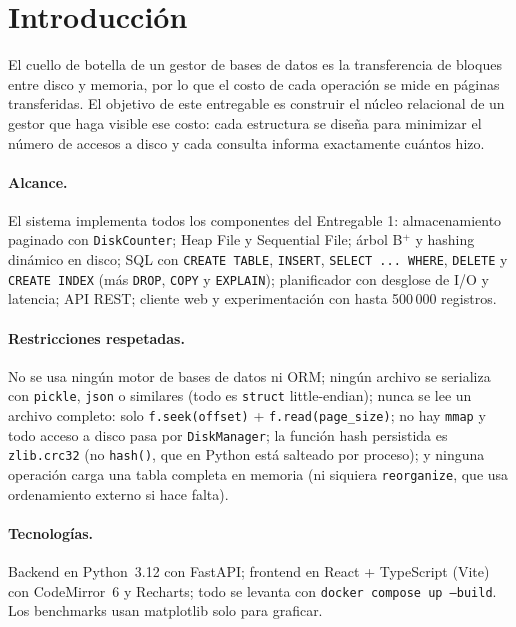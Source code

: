 \documentclass[11pt,a4paper]{article}
\newcommand{\code}[1]{\texttt{#1}}
\begin{document}
\clearpage
\tableofcontents
\clearpage

\section{Introducción}

El cuello de botella de un gestor de bases de datos es la transferencia de bloques entre disco y
memoria, por lo que el costo de cada operación se mide en páginas transferidas. El objetivo de este
entregable es construir el núcleo relacional de un gestor que haga visible ese costo: cada estructura
se diseña para minimizar el número de accesos a disco y cada consulta informa exactamente cuántos hizo.

\paragraph{Alcance.} El sistema implementa todos los componentes del Entregable 1:
almacenamiento paginado con \code{DiskCounter}; Heap File y Sequential File; árbol B$^+$ y hashing
dinámico en disco; SQL con \code{CREATE TABLE}, \code{INSERT}, \code{SELECT ... WHERE},
\code{DELETE} y \code{CREATE INDEX} (más \code{DROP}, \code{COPY} y \code{EXPLAIN}); planificador
con desglose de I/O y latencia; API REST; cliente web y experimentación con hasta 500\,000 registros.

\paragraph{Restricciones respetadas.} No se usa ningún motor de bases de datos ni ORM; ningún
archivo se serializa con \code{pickle}, \code{json} o similares (todo es \code{struct} little-endian);
nunca se lee un archivo completo: solo \code{f.seek(offset)} + \code{f.read(page\_size)}; no hay
\code{mmap} y todo acceso a disco pasa por \code{DiskManager}; la función hash persistida es
\code{zlib.crc32} (no \code{hash()}, que en Python está salteado por proceso); y ninguna operación
carga una tabla completa en memoria (ni siquiera \code{reorganize}, que usa ordenamiento externo si
hace falta).

\paragraph{Tecnologías.} Backend en Python~3.12 con FastAPI; frontend en React + TypeScript (Vite)
con CodeMirror~6 y Recharts; todo se levanta con \code{docker compose up --build}. Los benchmarks usan
matplotlib solo para graficar.
\end{document}
